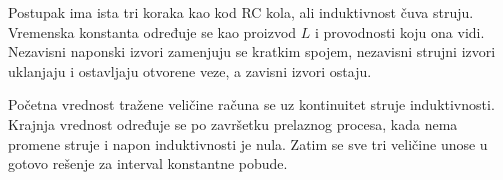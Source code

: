 Postupak ima ista tri koraka kao kod RC kola, ali induktivnost čuva struju. Vremenska konstanta određuje se kao proizvod $L$ i provodnosti koju ona vidi. Nezavisni naponski izvori zamenjuju se kratkim spojem, nezavisni strujni izvori uklanjaju i ostavljaju otvorene veze, a zavisni izvori ostaju.

Početna vrednost tražene veličine računa se uz kontinuitet struje induktivnosti. Krajnja vrednost određuje se po završetku prelaznog procesa, kada nema promene struje i napon induktivnosti je nula. Zatim se sve tri veličine unose u gotovo rešenje za interval konstantne pobude.
